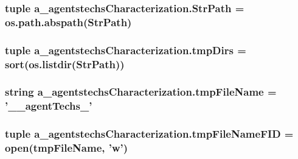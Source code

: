 \hypertarget{namespacea__agentstechs_characterization_a02836d75539fad783b19b5d9daf7912d}{
\subsubsection[{Str\-Path}]{\setlength{\rightskip}{0pt plus 5cm}tuple a\-\_\-agentstechs\-Characterization.\-Str\-Path = os.\-path.\-abspath(Str\-Path)}}\label{namespacea__agentstechs_characterization_a02836d75539fad783b19b5d9daf7912d}
\hypertarget{namespacea__agentstechs_characterization_a7caffbeb121cb9f1ec04fe723dbd82e8}{
\subsubsection[{tmp\-Dirs}]{\setlength{\rightskip}{0pt plus 5cm}tuple a\-\_\-agentstechs\-Characterization.\-tmp\-Dirs = sort(os.\-listdir({\bf Str\-Path}))}}\label{namespacea__agentstechs_characterization_a7caffbeb121cb9f1ec04fe723dbd82e8}
\hypertarget{namespacea__agentstechs_characterization_a06dabcb3460c501f3e8feb1c31b84b53}{
\subsubsection[{tmp\-File\-Name}]{\setlength{\rightskip}{0pt plus 5cm}string a\-\_\-agentstechs\-Characterization.\-tmp\-File\-Name = '\-\_\-\-\_\-agent\-Techs\-\_\-'}}\label{namespacea__agentstechs_characterization_a06dabcb3460c501f3e8feb1c31b84b53}
\hypertarget{namespacea__agentstechs_characterization_a15f3dec33abf61c3895a39228a777b9a}{
\subsubsection[{tmp\-File\-Name\-F\-I\-D}]{\setlength{\rightskip}{0pt plus 5cm}tuple a\-\_\-agentstechs\-Characterization.\-tmp\-File\-Name\-F\-I\-D = open({\bf tmp\-File\-Name}, 'w')}}\label{namespacea__agentstechs_characterization_a15f3dec33abf61c3895a39228a777b9a}
